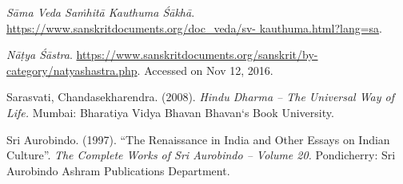 \begin{thebibliography}{99}
  \textit{Sāma Veda Saṁhitā Kauthuma Śākhā}. \url{https://www.sanskritdocuments.org/doc_veda/sv- kauthuma.html?lang=sa}.

  \textit{Nāṭya Śāstra}. \url{https://www.sanskritdocuments.org/sanskrit/by-category/natyashastra.php}. Accessed on Nov 12, 2016.

  Sarasvati, Chandasekharendra. (2008). \textit{Hindu Dharma – The Universal Way of Life.} Mumbai: Bharatiya Vidya Bhavan Bhavan‘s Book University.

  Sri Aurobindo. (1997). “The Renaissance in India and Other Essays on Indian Culture”. \textit{The Complete Works of Sri Aurobindo – Volume 20.} Pondicherry: Sri Aurobindo Ashram Publications Department.

 \end{thebibliography}

